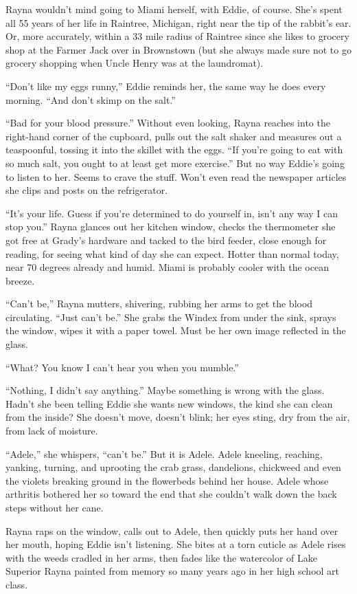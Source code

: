 \documentclass[twoside,10pt]{book}
\begin{document}
Rayna wouldn't mind going to Miami herself, with Eddie, of course. She's
spent all 55 years of her life in Raintree, Michigan, right near the tip
of the rabbit's ear. Or, more accurately, within a 33 mile radius of
Raintree since she likes to grocery shop at the Farmer Jack over in
Brownstown (but she always made sure not to go grocery shopping when
Uncle Henry was at the laundromat).

``Don't like my eggs runny,'' Eddie reminds her, the same way he does
every morning. ``And don't skimp on the salt.''

``Bad for your blood pressure.'' Without even looking, Rayna reaches
into the right-hand corner of the cupboard, pulls out the salt shaker
and measures out a teaspoonful, tossing it into the skillet with the
eggs. ``If you're going to eat with so much salt, you ought to at least
get more exercise.'' But no way Eddie's going to listen to her. Seems to
crave the stuff. Won't even read the newspaper articles she clips and
posts on the refrigerator.

``It's your life. Guess if you're determined to do yourself in, isn't
any way I can stop you.'' Rayna glances out her kitchen window, checks
the thermometer she got free at Grady's hardware and tacked to the
bird feeder, close enough for reading, for seeing what kind of day she
can expect. Hotter than normal today, near 70 degrees already and humid.
Miami is probably cooler with the ocean breeze.

``Can't be,'' Rayna mutters, shivering, rubbing her arms to get the
blood circulating. ``Just can't be.'' She grabs the Windex from under
the sink, sprays the window, wipes it with a paper towel. Must be her
own image reflected in the glass.

``What? You know I can't hear you when you mumble.''

``Nothing, I didn't say anything.'' Maybe something is wrong with the
glass. Hadn't she been telling Eddie she wants new windows, the kind she
can clean from the inside? She doesn't move, doesn't blink; her eyes
sting, dry from the air, from lack of moisture.

``Adele,'' she whispers, ``can't be.'' But it is Adele. Adele kneeling,
reaching, yanking, turning, and uprooting the crab grass, dandelions,
chickweed and even the violets breaking ground in the flower­beds behind
her house. Adele whose arthritis bothered her so toward the end that she
couldn't walk down the back steps without her cane.

Rayna raps on the window, calls out to Adele, then quickly puts her hand
over her mouth, hoping Eddie isn't listening. She bites at a torn
cuticle as Adele rises with the weeds cradled in her arms, then fades
like the watercolor of Lake Superior Rayna painted from memory so many
years ago in her high school art class.
\end{document}
